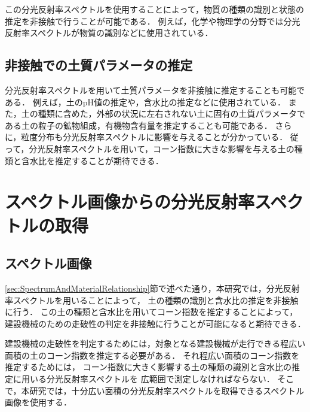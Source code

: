 この分光反射率スペクトルを使用することによって，物質の種類の識別と状態の推定を非接触で行うことが可能である．
例えば，化学や物理学の分野では分光反射率スペクトルが物質の識別などに使用されている\cite{長田2004}．


\subsection{非接触での土質パラメータの推定}
\label{ssec:NonContactEstimation}

分光反射率スペクトルを用いて土質パラメータを非接触に推定することも可能である．
例えば，土のpH値の推定や，含水比の推定などに使用されている\cite{Ben-Dor2002}\cite{Rossel2006}．%
また，土の種類に含めた，外部の状況に左右されない土に固有の土質パラメータである土の粒子の鉱物組成，有機物含有量を推定することも可能である\cite{Ben-Dor1995}\cite{Janik1998}．
さらに，粒度分布も分光反射率スペクトルに影響を与えることが分かっている\cite{小嶋1996}．
従って，分光反射率スペクトルを用いて，コーン指数に大きな影響を与える土の種類と含水比を推定することが期待できる\cite{小川1989}\cite{Jia2017}．

\clearpage


\section{スペクトル画像からの分光反射率スペクトルの取得}
\label{sec:SpectrumFromSpectralImage}

\subsection{スペクトル画像}
\label{ssec:SpectralImage}

\ref{sec:SpectrumAndMaterialRelationship}節で述べた通り，本研究では，分光反射率スペクトルを用いることによって，
土の種類の識別と含水比の推定を非接触に行う．
この土の種類と含水比を用いてコーン指数を推定することによって，建設機械のための走破性の判定を非接触に行うことが可能になると期待できる．

建設機械の走破性を判定するためには，対象となる建設機械が走行できる程広い面積の土のコーン指数を推定する必要がある．
それ程広い面積のコーン指数を推定するためには，
コーン指数に大きく影響する土の種類の識別と含水比の推定に用いる分光反射率スペクトルを
広範囲で測定しなければならない．
そこで，本研究では，十分広い面積の分光反射率スペクトルを取得できるスペクトル画像を使用する\cite{蔦2002}\cite{長田2004}\cite{田代2013}．

